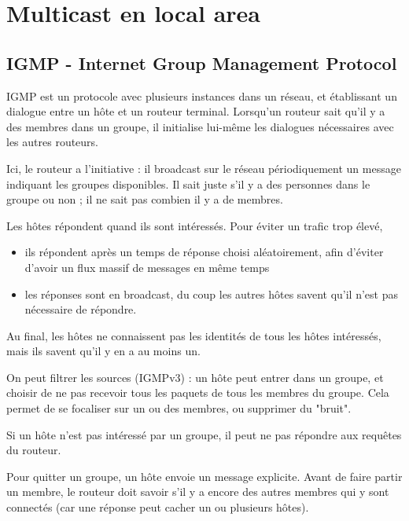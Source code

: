 \documentclass[10pt,a4paper]{report}
\begin{document}
	\section{Multicast en local area}
	
		\subsection{IGMP - Internet Group Management Protocol}
		IGMP est un protocole avec plusieurs instances dans un réseau, et établissant un dialogue entre un hôte et un routeur terminal. Lorsqu'un routeur sait qu'il y a des membres dans un groupe, il initialise lui-même les dialogues nécessaires avec les autres routeurs.
		
		Ici, le routeur a l'initiative : il broadcast sur le réseau périodiquement un message indiquant les groupes disponibles. Il sait juste s'il y a des personnes dans le groupe ou non ; il ne sait pas combien il y a de membres.
	
		Les hôtes répondent quand ils sont intéressés. Pour éviter un trafic trop élevé,
	
		\begin{itemize}
			\item ils répondent après un temps de réponse choisi aléatoirement, afin d'éviter d'avoir un flux massif de messages en même temps
			\item les réponses sont en broadcast, du coup les autres hôtes savent qu'il n'est pas nécessaire de répondre.
		\end{itemize}
	
		Au final, les hôtes ne connaissent pas les identités de tous les hôtes intéressés, mais ils savent qu'il y en a au moins un.
	
	
		On peut filtrer les sources (IGMPv3) : un hôte peut entrer dans un groupe, et choisir de ne pas recevoir tous les paquets de tous les membres du groupe. Cela permet de se focaliser sur un ou des membres, ou supprimer du "bruit".
	
		Si un hôte n'est pas intéressé par un groupe, il peut ne pas répondre aux requêtes du routeur.
	
		Pour quitter un groupe, un hôte envoie un message explicite. Avant de faire partir un membre, le routeur doit savoir s'il y a encore des autres membres qui y sont connectés (car une réponse peut cacher un ou plusieurs hôtes).
	
\end{document}
